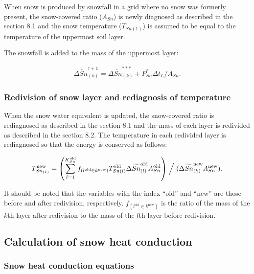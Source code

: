 When snow is produced by snowfall in a grid where no snow was formerly present, the snow-covered ratio (\(A_{Sn}\)) is newly diagnosed as described in the section 8.1 and the snow temperature
(\(T_{Sn(1)}\)) is assumed to be equal to the temperature of the uppermost soil layer.

The snowfall is added to the mass of the uppermost layer:

\begin{eqnarray}
\Delta \widetilde{Sn}_{(k)}^{\tau+1} = \Delta \widetilde{Sn}_{(k)}^{\ast\ast\ast} + P_{Sn}^{\ast} \Delta t_L /A_{Sn}. \label{8-30}
\end{eqnarray}

\hypertarget{redivision-of-snow-layer-and-rediagnosis-of-temperature}{%
\subsubsection{Redivision of snow layer and rediagnosis of temperature}\label{redivision-of-snow-layer-and-rediagnosis-of-temperature}}

When the snow water equivalent is updated, the snow-covered ratio is rediagnosed as described in the section 8.1 and the mass of each layer is redivided as described in the section 8.2. The
temperature in each redivided layer is rediagnosed so that the energy is conserved as follows:

\begin{eqnarray}
T_{Sn_{(k)}}^{\mathrm{new}} = \left(
 \sum_{l=1}^{K_{Sn}^{\mathrm{old}}}
 f_{(l^{\mathrm{old}}\in k^{\mathrm{new}})} T_{Sn(l)}^{\mathrm{old}}
 \Delta \widetilde{Sn}_{(l)}^{\mathrm{old}} A_{Sn}^{\mathrm{old}}
\right) \Bigm/ (\Delta \widetilde{Sn}_{(k)}^{\mathrm{new}} A_{Sn}^{\mathrm{new}}). \label{8-31}
\end{eqnarray}

It should be noted that the variables with the index ``old'' and ``new'' are those before and after redivision, respectively. \(f_{(l^{\mathrm{old}}\in k^{\mathrm{new}})}\) is the ratio of the mass of
the \(k\)th layer after redivision to the mass of the \(l\)th layer before redivision.

\hypertarget{calculation-of-snow-heat-conduction}{%
\subsection{Calculation of snow heat conduction}\label{calculation-of-snow-heat-conduction}}

\hypertarget{snow-heat-conduction-equations}{%
\subsubsection{Snow heat conduction equations}\label{snow-heat-conduction-equations}}

